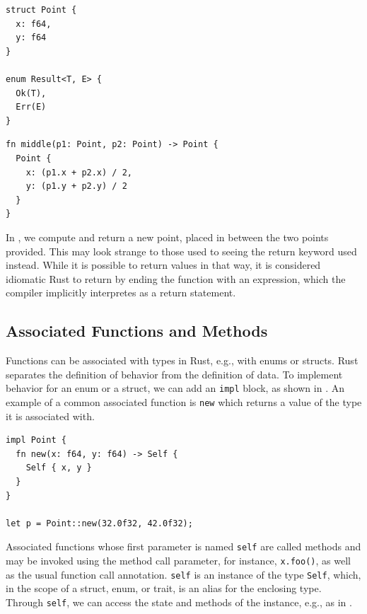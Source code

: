 \documentclass[paper=a4,%
  twoside,%
  BCOR4mm,%
  abstract=true,%
  toc=bibliography,%
  chapterprefix=true,%
  toc=bibliographynumbered,%
  open=right,%
  english,%
  pagesize=pdftex]{scrreprt}
\begin{document}
\begin{lstlisting}[style=boxed, caption={The type definition for a point in two-dimensional space and an enum definition}, label=lst:example-struct-enum]
struct Point {
  x: f64,
  y: f64
}

enum Result<T, E> {
  Ok(T),
  Err(E)
}
\end{lstlisting}


\begin{lstlisting}[style=boxed, caption={A function to compute the point between two points in two-dimensional space}, label=lst:example-functions-struct-enum]
fn middle(p1: Point, p2: Point) -> Point {
  Point {
    x: (p1.x + p2.x) / 2,
    y: (p1.y + p2.y) / 2
  }
}
\end{lstlisting}

In , we compute and return a new point, placed in between the two points provided. This may look strange to those used to seeing the return keyword used instead. While it is possible to return values in that way, it is considered idiomatic Rust to return by ending the function with an expression, which the compiler implicitly interpretes as a return statement.

\subsection{Associated Functions and Methods}
Functions can be associated with types in Rust, e.g., with enums or structs. Rust separates the definition of behavior from the definition of data. To implement behavior for an enum or a struct, we can add an \texttt{impl} block, as shown in . An example of a common associated function is \texttt{new} which returns a value of the type it is associated with.

\begin{lstlisting}[style=boxed, caption={Associating behavior with the \texttt{Point} data type defined in \Cref{lst:example-struct-enum}}, label=lst:example-associated-function]
impl Point {
  fn new(x: f64, y: f64) -> Self {
    Self { x, y }
  }
}

let p = Point::new(32.0f32, 42.0f32);
\end{lstlisting}

Associated functions whose first parameter is named \texttt{self} are called methods and may be invoked using the method call parameter, for instance, \texttt{x.foo()}, as well as the usual function call annotation. \texttt{self} is an instance of the type \texttt{Self}, which, in the scope of a struct, enum, or trait, is an alias for the enclosing type. Through \texttt{self}, we can access the state and methods of the instance, e.g., as in .
\end{document}
